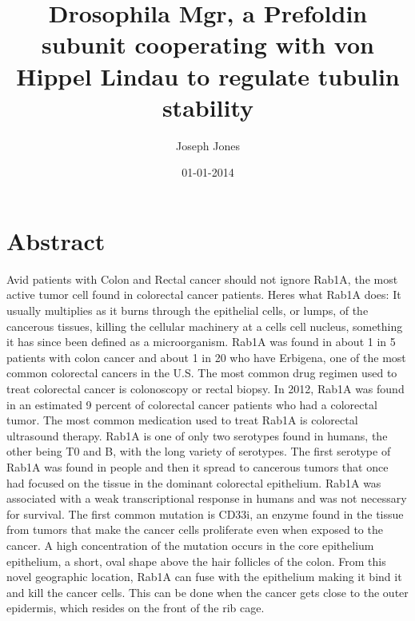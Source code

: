 \documentclass{article}%
\title{Drosophila Mgr, a Prefoldin subunit cooperating with von Hippel Lindau to regulate tubulin stability}%
\author{Joseph Jones}%
\affil{Department of Animal and Poultry Sciences, Virginia Tech, Blacksburg, Virginia, United States of America}%
\date{01{-}01{-}2014}%
\begin{document}
%
\normalsize%
\maketitle%
\section{Abstract}%
\label{sec:Abstract}%
Avid patients with Colon and Rectal cancer should not ignore Rab1A, the most active tumor cell found in colorectal cancer patients.\newline%
Heres what Rab1A does:\newline%
It usually multiplies as it burns through the epithelial cells, or lumps, of the cancerous tissues, killing the cellular machinery at a cells cell nucleus, something it has since been defined as a microorganism.\newline%
Rab1A was found in about 1 in 5 patients with colon cancer and about 1 in 20 who have Erbigena, one of the most common colorectal cancers in the U.S.\newline%
The most common drug regimen used to treat colorectal cancer is colonoscopy or rectal biopsy.\newline%
In 2012, Rab1A was found in an estimated 9 percent of colorectal cancer patients who had a colorectal tumor. The most common medication used to treat Rab1A is colorectal ultrasound therapy.\newline%
Rab1A is one of only two serotypes found in humans, the other being T0 and B, with the long variety of serotypes.\newline%
The first serotype of Rab1A was found in people and then it spread to cancerous tumors that once had focused on the tissue in the dominant colorectal epithelium.\newline%
Rab1A was associated with a weak transcriptional response in humans and was not necessary for survival. The first common mutation is CD33i, an enzyme found in the tissue from tumors that make the cancer cells proliferate even when exposed to the cancer.\newline%
A high concentration of the mutation occurs in the core epithelium epithelium, a short, oval shape above the hair follicles of the colon. From this novel geographic location, Rab1A can fuse with the epithelium making it bind it and kill the cancer cells.\newline%
This can be done when the cancer gets close to the outer epidermis, which resides on the front of the rib cage.\newline%
\end{document}
